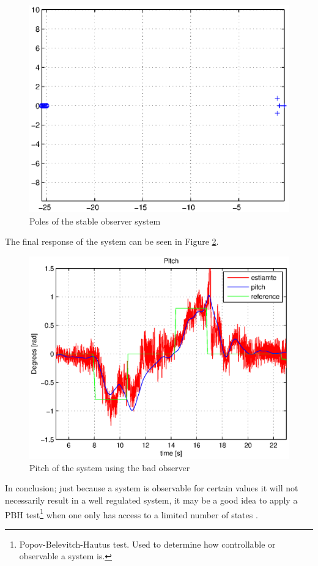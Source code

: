 \begin{figure}[H]
    \centering
	\includegraphics[width=0.9\linewidth]{plots/part4new/P4p3_poles.eps}
    \caption{Poles of the stable observer system}
    \label{fig:P4p3_poles}
\end{figure}

The final response of the system can be seen in Figure \ref{fig:P4p3_pitch}. 

\begin{figure}[H]
    \centering
	\includegraphics[width=0.9\linewidth]{plots/part4new/P4p3_bra_pitch.eps}
    \caption{Pitch of the system using the bad observer}
    \label{fig:P4p3_pitch}
\end{figure}

In conclusion; just because a system is observable for certain values it will not necessarily result in a well regulated system, it may be a good idea to apply a PBH test\footnote{Popov-Belevitch-Hautus test. Used to determine how controllable or observable a system is.} when one only has access to a limited number of states \cite{youtube}.

\newpage
